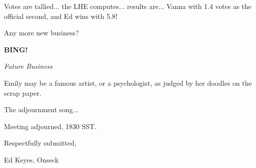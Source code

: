 \documentclass[12pt]{article}
\newcommand{\bing}{{\bf BING!} }
\newcommand{\goto}[1]{\bing \vskip 12pt \centerline{{\em{#1}}}}
\begin{document}
Votes are tallied... the LHE computes... results are... Vanna with 1.4
votes as the official second, and Ed wins with 5.8!

Any more new business?

\goto{Future Business}

Emily may be a famous artist, or a psychologist, as judged by her doodles
on the scrap paper.

The adjournment song...

\vspace{12pt}

\noindent
Meeting adjourned, 1830 SST.

\vspace{18pt}

\centerline{Respectfully submitted,}
\centerline{Ed Keyes, Onseck}
\end{document}
